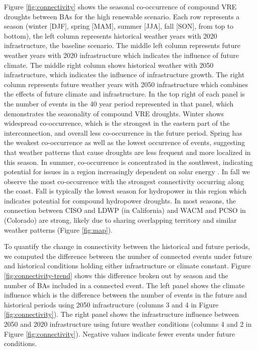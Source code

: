\documentclass{agujournal2019}
\begin{document}
Figure \ref{fig:connectivity} shows the seasonal co-occurrence of compound VRE droughts between BAs for the high renewable scenario. Each row represents a season (winter [DJF], spring [MAM], summer [JJA], fall [SON], from top to bottom), the left column represents historical weather years with 2020 infrastructure, the baseline scenario. The middle left column represents future weather years with 2020 infrastructure which indicates the influence of future climate. The middle right column shows historical weather with 2050 infrastructure, which indicates the influence of infrastructure growth. The right column represents future weather years with 2050 infrastructure which combines the effects of future climate and infrastructure. In the top right of each panel is the number of events in the 40 year period represented in that panel, which demonstrates the seasonality of compound VRE droughts. Winter shows widespread co-occurrence, which is the strongest in the eastern part of the interconnection, and overall less co-occurrence in the future period. Spring has the weakest co-occurrence as well as the lowest occurrence of events, suggesting that weather patterns that cause droughts are less frequent and more localized in this season. In summer, co-occurrence is concentrated in the southwest, indicating potential for issues in a region increasingly dependent on solar energy \cite{Tabassum_2021}. In fall we observe the most co-occurrence with the strongest connectivity occurring along the coast. Fall is typically the lowest season for hydropower in this region which indicates potential for compound hydropower droughts. In most seasons, the connection between CISO and LDWP (in California) and WACM and PCSO in (Colorado) are strong, likely due to sharing overlapping territory and similar weather patterns (Figure \ref{fig:map}).

To quantify the change in connectivity between the historical and future periods, we computed the difference between the number of connected events under future and historical conditions holding either infrastructure or climate constant. Figure \ref{fig:connectivity-trend} shows this difference broken out by season and the number of BAs included in a connected event. The left panel shows the climate influence which is the difference between the number of events in the future and historical periods using 2050 infrastructure (columns 3 and 4 in Figure \ref{fig:connectivity}). The right panel shows the infrastructure influence between 2050 and 2020 infrastructure using future weather conditions (columns 4 and 2 in Figure \ref{fig:connectivity}). Negative values indicate fewer events under future conditions. 
\end{document}
